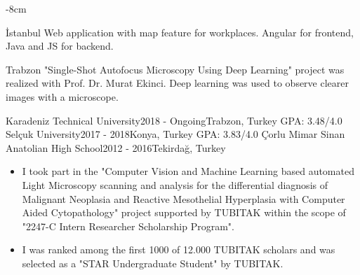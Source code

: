 \documentclass[10pt,a4paper]{altacv}
\begin{document}

\begin{adjustwidth}{}{-8cm}
\makecvheader
\end{adjustwidth}

 {İstanbul}
Web application with map feature for workplaces. Angular for frontend, Java and JS for backend.

\smallskip

 {Trabzon}
"Single-Shot Autofocus Microscopy Using Deep Learning" project was realized with Prof. Dr. Murat Ekinci. Deep learning was used to observe clearer images with a microscope.


 {Karadeniz Technical University}{2018 - Ongoing}{Trabzon, Turkey} 
\textsc{GPA}: 3.48/4.0
\smallskip
\cvevent{} {Selçuk University}{2017 - 2018}{Konya, Turkey} 
\textsc{GPA}: 3.83/4.0
\smallskip
\cvevent{} {Çorlu Mimar Sinan Anatolian High School}{2012 -  2016}{Tekirdağ, Turkey}




\begin{itemize}
    \item I took part in the "Computer Vision and Machine Learning based automated Light Microscopy scanning and analysis for the differential diagnosis of Malignant Neoplasia and Reactive Mesothelial Hyperplasia with Computer Aided Cytopathology" project supported by TUBITAK within the scope of "2247-C Intern Researcher Scholarship Program".
\end{itemize}


\begin{itemize}
    \item I was ranked among the first 1000 of 12.000 TUBITAK scholars and was selected as a "STAR Undergraduate Student" by TUBITAK.
\end{itemize}
\end{document}
